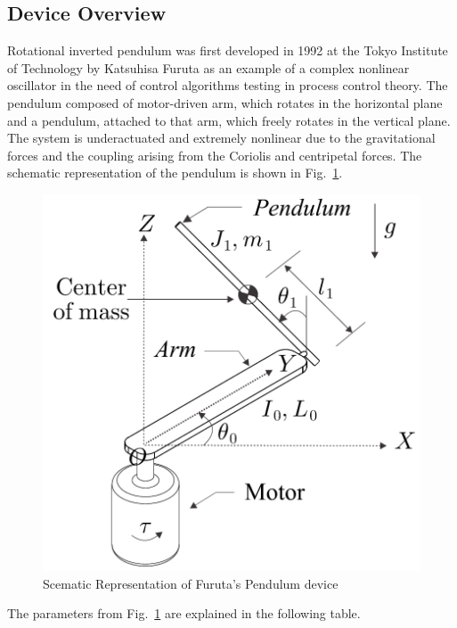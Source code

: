 \subsection{Device Overview}
Rotational inverted pendulum was first developed in 1992 at the Tokyo Institute of Technology by Katsuhisa Furuta as an example of a complex nonlinear oscillator in the need of control algorithms testing in process control theory.
The pendulum composed of motor-driven arm, which rotates in the horizontal plane and a pendulum, attached to that arm, which freely rotates in the vertical plane. The system is underactuated and extremely nonlinear due to the gravitational forces and the coupling arising from the Coriolis and centripetal forces. The schematic representation of the pendulum is shown in Fig.~\ref{furuta:schematic}.
\newpage
\begin{figure}[h]
	\centering
	\includegraphics[width=.6\linewidth]{images/furuta}
	\caption{Scematic Representation of Furuta's Pendulum device}
	\label{furuta:schematic}
\end{figure}
The parameters from Fig.~\ref{furuta:schematic} are explained in the following table.

